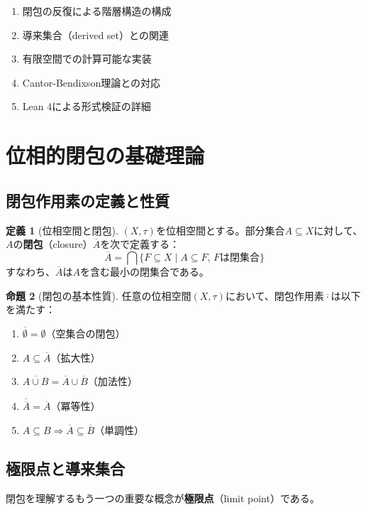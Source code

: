 \documentclass[a4paper,12pt]{ltjsarticle}
\theoremstyle{definition}
\newtheorem{definition}{定義}[section]
\newtheorem{proposition}[definition]{命題}
\begin{document}
\begin{enumerate}
\item 閉包の反復による階層構造の構成
\item 導来集合（derived set）との関連
\item 有限空間での計算可能な実装
\item Cantor-Bendixson理論との対応
\item Lean 4による形式検証の詳細
\end{enumerate}

\section{位相的閉包の基礎理論}

\subsection{閉包作用素の定義と性質}

\begin{definition}[位相空間と閉包]
$(X, \tau)$を位相空間とする。部分集合$A \subseteq X$に対して、
$A$の\textbf{閉包}（closure）$\overline{A}$を次で定義する：
\[
\overline{A} = \bigcap \{F \subseteq X \mid A \subseteq F, \, F \text{は閉集合}\}
\]
すなわち、$\overline{A}$は$A$を含む最小の閉集合である。
\end{definition}

\begin{proposition}[閉包の基本性質]
任意の位相空間$(X, \tau)$において、閉包作用素$\overline{\cdot}$は以下を満たす：
\begin{enumerate}[label=(\alph*)]
\item $\overline{\emptyset} = \emptyset$（空集合の閉包）
\item $A \subseteq \overline{A}$（拡大性）
\item $\overline{A \cup B} = \overline{A} \cup \overline{B}$（加法性）
\item $\overline{\overline{A}} = \overline{A}$（冪等性）
\item $A \subseteq B \Rightarrow \overline{A} \subseteq \overline{B}$（単調性）
\end{enumerate}
\end{proposition}

\subsection{極限点と導来集合}

閉包を理解するもう一つの重要な概念が\textbf{極限点}（limit point）である。
\end{document}

